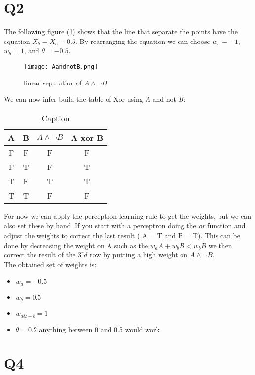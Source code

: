 \documentclass[11pt, a4paper]{article}
\begin{document}
\section{Q2}

    
    The following figure (\ref{fig:linsep}) shows that the line that separate the points have the equation $ X_b = X_a -0.5$. By rearranging the equation we can choose $w_a = -1$, $w_b = 1$, and $\theta = -0.5$.\\

    \begin{figure}[h]
      \centering
        \texttt{[image: AandnotB.png]}
      \caption{linear separation of $A\wedge \neg B$}
      \label{fig:linsep}
    \end{figure}
    
    We can now infer build the table of Xor using $A$ and not $B$:
    \begin{table}[h!]
        \centering
        \begin{tabular}{c|c|c|c}
            A & B & $A\wedge \neg B$ & A xor B \\
            \hline
            F & F & F & F \\
            F & T & F & T\\
            T & F & T & T\\
            T & T & F & F 
        \end{tabular}
        \caption{Caption}
        \label{tab:my_label}
    \end{table}
    
    For now we can apply the perceptron learning rule to get the weights, but we can also set these by hand. If you start with a perceptron doing the \emph{or} function and adjust the weights to correct the last result ( A = T and B = T). This can be done by decreasing the weight on A such as the $w_aA+w_bB<w_bB$ we then correct the result of the $3^rd$ row by putting a high weight on $A \wedge \neg B$.\\
    The obtained set of weights is:
    \begin{itemize}
        \item $w_a = -0.5$
        \item $w_b = 0.5$
        \item $w_{a\&-b} = 1$
        \item $\theta = 0.2$ anything between 0 and 0.5 would work
\end{itemize}

\section{Q4}
\end{document}
